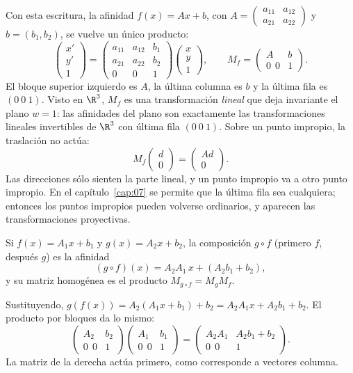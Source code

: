 Con esta escritura, la afinidad \(f(x)=Ax+b\), con \(A=\begin{pmatrix}a_{11}&a_{12}\\a_{21}&a_{22}\end{pmatrix}\)
y \(b=(b_1,b_2)\), se vuelve un único producto:
\[
\begin{pmatrix}x'\\y'\\1\end{pmatrix}
=
\begin{pmatrix}
a_{11}&a_{12}&b_1\\
a_{21}&a_{22}&b_2\\
0&0&1
\end{pmatrix}
\begin{pmatrix}x\\y\\1\end{pmatrix},
\qquad
M_f=\begin{pmatrix}A&b\\0\ \ 0&1\end{pmatrix}.
\]
El bloque superior izquierdo es \(A\), la última columna es \(b\) y la última fila es
\((0\ 0\ 1)\). Visto en \(\R^3\), \(M_f\) es una transformación \emph{lineal} que deja
invariante el plano \(w=1\): las afinidades del plano son exactamente las transformaciones
lineales invertibles de \(\R^3\) con última fila \((0\ 0\ 1)\). Sobre un punto impropio, la
traslación no actúa:
\[
  M_f\begin{pmatrix}d\\0\end{pmatrix}=\begin{pmatrix}Ad\\0\end{pmatrix}.
\]
Las direcciones sólo sienten la parte lineal, y un punto impropio va a otro punto impropio.
En el capítulo~\ref{cap:07} se permite que la última fila sea cualquiera; entonces los
puntos impropios pueden volverse ordinarios, y aparecen las transformaciones proyectivas.

\begin{proposicion}\label{prop:06-composicion}
Si \(f(x)=A_1x+b_1\) y \(g(x)=A_2x+b_2\), la composición \(g\circ f\) (primero \(f\), después
\(g\)) es la afinidad
\[
  (g\circ f)(x)=A_2A_1\,x+(A_2b_1+b_2),
\]
y su matriz homogénea es el producto \(M_{g\circ f}=M_gM_f\).
\end{proposicion}

\begin{demostracion}
Sustituyendo, \(g(f(x))=A_2(A_1x+b_1)+b_2=A_2A_1x+A_2b_1+b_2\). El producto por bloques da lo
mismo:
\[
\begin{pmatrix}A_2&b_2\\0\ \ 0&1\end{pmatrix}
\begin{pmatrix}A_1&b_1\\0\ \ 0&1\end{pmatrix}
=
\begin{pmatrix}A_2A_1&A_2b_1+b_2\\0\ \ 0&1\end{pmatrix}.
\]
La matriz de la derecha actúa primero, como corresponde a vectores columna.
\end{demostracion}

